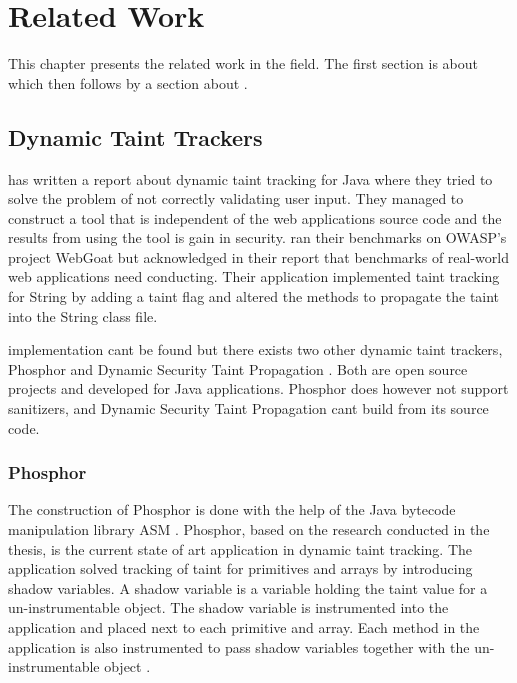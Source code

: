 \chapter{Related Work}

This chapter presents the related work in the field. The first section is about \textit{} which then follows by a section about \textit{}.



\section{Dynamic Taint Trackers}
\label{RW:DynamicTaintTracking}
\textcite{Haldar} has written a report about dynamic taint tracking for Java where they tried to solve the problem of not correctly validating user input. They managed to construct a tool that is independent of the web applications source code and the results from using the tool is gain in security. \textcite{Haldar} ran their benchmarks on OWASP’s project WebGoat \parencite{webgoat} but acknowledged in their report that benchmarks of real-world web applications need conducting. Their application implemented taint tracking for String by adding a taint flag and altered the methods to propagate the taint into the String class file.

\textcite{Haldar} implementation cant be found but there exists two other dynamic taint trackers, Phosphor \parencite{phosphor} and Dynamic Security Taint Propagation \parencite{securityTaint}. Both are open source projects and developed for Java applications. Phosphor does however not support sanitizers, and Dynamic Security Taint Propagation cant build from its source code.



\subsection{Phosphor}
The construction of Phosphor \parencite{phosphor} is done with the help of the Java bytecode manipulation library ASM \parencite{asm}. Phosphor, based on the research conducted in the thesis, is the current state of art application in dynamic taint tracking. The application solved tracking of taint for primitives and arrays by introducing shadow variables. A shadow variable is a variable holding the taint value for a un-instrumentable object. The shadow variable is instrumented into the application and placed next to each primitive and array. Each method in the application is also instrumented to pass shadow variables together with the un-instrumentable object \parencite{BellJ.2014PIdd}.



